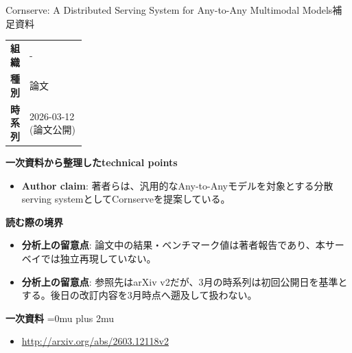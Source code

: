 \begin{technicalnote}{Cornserve: A Distributed Serving System for Any-to-Any Multimodal Models}{補足資料}
\begingroup
\begin{tabularx}{\linewidth}{@{}>{\bfseries}p{0.22\linewidth}X@{}}
組織 & - \\
種別 & 論文 \\
時系列 & 2026-03-12 (論文公開) \\
\end{tabularx}
\smallskip
{\bfseries 一次資料から整理したtechnical points}
\begin{itemize}[leftmargin=1.5em,itemsep=0.35em]
\item \textbf{Author claim}: 著者らは、汎用的なAny-to-Anyモデルを対象とする分散serving systemとしてCornserveを提案している。
\end{itemize}
\begin{minipage}{\linewidth}
{\bfseries 読む際の境界}
\begin{itemize}[leftmargin=1.5em,itemsep=0.35em]
\item \textbf{分析上の留意点}: 論文中の結果・ベンチマーク値は著者報告であり、本サーベイでは独立再現していない。
\item \textbf{分析上の留意点}: 参照先はarXiv v2だが、3月の時系列は初回公開日を基準とする。後日の改訂内容を3月時点へ遡及して扱わない。
\end{itemize}
\begin{samepage}
{\bfseries 一次資料}
\begingroup\sloppy
\Urlmuskip=0mu plus 2mu\relax
\begin{itemize}[leftmargin=1.5em,itemsep=0.25em]
\item {\scriptsize\url{http://arxiv.org/abs/2603.12118v2}}
\end{itemize}
\endgroup
\end{samepage}
\end{minipage}
\endgroup
\end{technicalnote}
\medskip

